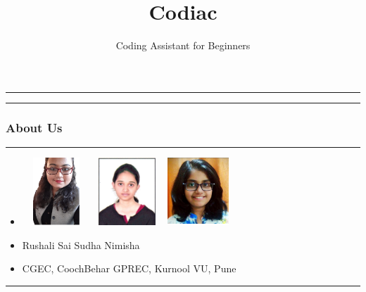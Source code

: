 \documentclass[14pt]{beamer}
\title[Codiac]{Codiac}
\author[]{Coding Assistant for Beginners}
\begin{document}
\begin{frame}
    \noindent
    {\color{pink} \rule{\linewidth}{0.7mm} }
    \titlepage
    \noindent
    {\color{pink} \rule{\linewidth}{0.7mm} }
\end{frame}

\begin{frame}
    \frametitle{About Us}
    \noindent
    {\color{pink} \rule {\linewidth}{0.7mm}}
    \begin{itemize}
      \item [] \includegraphics[width=1in, height=1in]{./Codiac/logos/rushali.jpeg}\hspace{1cm} \includegraphics[width=1in, height=1in]{./Codiac/logos/sudha.jpeg}\hspace{1cm} \includegraphics[width=1in, height=1in]{./Codiac/logos/nimisha.jpg}\hspace{1cm} \\
      \item [] Rushali\hspace{2cm} Sai Sudha\hspace{2cm} Nimisha\\
      \item [] \small CGEC, CoochBehar\hspace{0.2cm} \small GPREC, Kurnool \hspace{1cm} \small VU, Pune\\ 
    \end{itemize}
    \noindent
    {\color{pink} \rule{\linewidth}{0.7mm}}
\end{frame}
\end{document}
